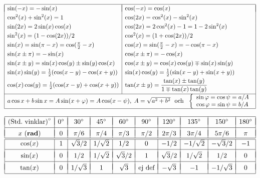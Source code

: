 \documentclass{article}
\begin{document}
$\begin{array}{|l|l|}\hline &\\*[-11pt] %
 \sin(-x)=-\sin(x) &\cos(-x)=\cos(x) \EndRow
 \cos^2(x)+\sin^2(x)=1  &
 \cos(2x)=\cos^2(x)-\sin^2(x) \EndRow %
 \sin(2x)=2\sin(x)\cos(x)&\cos(2x)=2\cos^2(x)-1=1-2\sin^2(x) \EndRow
 \sin^2(x) = (1-\cos(2x))/2 &
 \cos^2(x) = (1+\cos(2x))/2 \EndRow %
 \sin(x)=\sin(\pi-x)=\cos(\frac{\pi}{2}-x) &
 \cos(x)=\sin(\frac{\pi}{2}-x)=-\cos(\pi-x)\EndRow 
 \sin(x\pm\pi) = -\sin(x) &
 \cos(x\pm\pi) = -\cos(x) \EndRow %
 \sin(x\pm y)=\sin(x)\cos(y)\pm\sin(y)\cos(x) &
 \cos(x\pm y)=\cos(x)\cos(y)\mp\sin(x)\sin(y)\EndRow 
 \sin(x)\sin(y)=\frac{1}{2}(\cos(x-y)-\cos(x+y)) &
 \sin(x)\cos(y)=\frac{1}{2}(\sin(x-y)+\sin(x+y)) \EndRow
 \cos(x)\cos(y)=\frac{1}{2}(\cos(x-y)+\cos(x+y)) &
 \tan(x\pm y)=\dfrac{\tan(x)\pm\tan(y)}{1\mp\tan(x)\tan(y)}\\*[8pt]
 \cline{1-2}\multicolumn{2}{|c|}{     %
   a\cos x+b\sin x=A\sin(x+\varphi) = A\cos(x-\psi),\;
              A=\sqrt{a^2+b^2}  
     \mbox{ \ och \ }
              \left\{ \begin{array}{l}
              \sin\varphi=\cos\psi=a/A \\
              \cos\varphi=\sin\psi=b/A
\end{array}\right.}
 \EndRow\hline\end{array}$ %

\vspace{1 mm}

{%
\let\F\frac
\newcommand\CC[1]{#1^\circ}
\def\myEnd{\\*[2pt]\hline &&&&&&&&& \\*[-9pt]}
\def\myEnd{\\*[2pt]\hline &&&&&&&&& \\*[-9pt]}
\newcommand\tW{{\sqrt2}}
\newcommand\tH{{\sqrt3}}
$
\begin{array}{|c|c|c|c|c|c|c|c|c|c|}
\hline & & & & & & & & &\\*[-10pt]
\mbox{(Std.~vinklar)}^\circ
  & \CC{0} &\CC{30} &\CC{45} &\CC{60} &\CC{90} &\CC{120} &\CC{135} &\CC{150} &\CC{180}
 \myEnd
 x \mbox{ (\textbf{rad})} 
        & 0     & \pi/6 & \pi/4 &  \pi/3 & \pi/2 & 2\pi/3 & 3\pi/4 & 5\pi/6 &\pi 
 \\\hline\hline
 \cos(x)&   1   & \tH/2 & 1/\tW &  1/2  &   0   & -1/2   & -1/\tW & -\tH/2 & -1 
 \myEnd 
 \sin(x)&   0   &   1/2 & 1/\tW & \tH/2 &   1   & \tH/2  &  1/\tW &   1/2  &  0 
 \myEnd 
 \tan(x)&   0   & 1/\tH &   1   & \tH   &
                                    \mbox{ej def}
                                                &-\tH  &    -1  & -1/\tH &  0 
 \\*[2pt]\hline
\end{array}
$
}%
\end{document}
